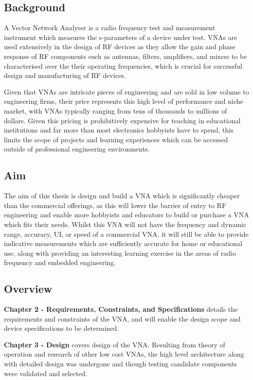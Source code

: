 \subsection{Background}
A Vector Network Analyser is a radio frequency test and measurement instrument which measures the s-parameters of a device under test. VNAs are used extensively in the design of RF devices as they allow the gain and phase response of RF components such as antennas, filters, amplifiers, and mixers to be characterised over the their operating frequencies, which is crucial for successful design and manufacturing of RF devices. \par

Given that VNAs are intricate pieces of engineering and are sold in low volume to engineering firms, their price represents this high level of performance and niche market, with VNAs typically ranging from tens of thousands to millions of dollars. Given this pricing is prohibitively expensive for teaching in educational institutions and far more than most electronics hobbyists have to spend, this limits the scope of projects and learning experiences which can be accessed outside of professional engineering environments. 

\subsection{Aim}
The aim of this thesis is design and build a VNA which is significantly cheaper than the commercial offerings, as this will lower the barrier of entry to RF engineering and enable more hobbyists and educators to build or purchase a VNA which fits their needs. Whilst this VNA will not have the frequency and dynamic range, accuracy, UI, or speed of a commercial VNA, it will still be able to provide indicative measurements which are sufficiently accurate for home or educational use, along with providing an interesting learning exercise in the areas of radio frequency and embedded engineering.  

\subsection{Overview}

\textbf{Chapter 2 - Requirements, Constraints, and Specifications} details the requirements and constraints of the VNA, and will enable the design scope and device specifications to be determined. \par

\textbf{Chapter 3 - Design} covers design of the VNA. Resulting from theory of operation and research of other low cost VNAs, the high level architecture along with detailed design was undergone and though testing candidate components were validated and selected.  \par

